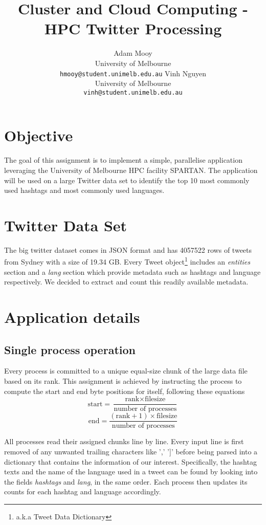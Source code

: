 \documentclass[11pt]{article}
\title{Cluster and Cloud Computing - HPC Twitter Processing}
\author{Adam Mooy\\
	    University of Melbourne\\
	    {\tt hmooy@student.unimelb.edu.au}
  \And Vinh Nguyen\\
  	University of Melbourne\\
	    {\tt vinh@student.unimelb.edu.au}}
\begin{document}
\maketitle

\section{Objective}

The goal of this assignment is to implement a simple, parallelise application leveraging the University of Melbourne HPC facility SPARTAN. The application will be used on a large Twitter data set to identify the top 10 most commonly used hashtags and most commonly used languages. 

\section{Twitter Data Set}
The big twitter dataset comes in JSON format and has 4057522 rows of tweets from Sydney with a size of 19.34 GB. Every Tweet object\footnote{a.k.a Tweet Data Dictionary} includes an \textit{entities} section and a \textit{lang} section which provide metadata such as hashtags and language respectively. We decided to extract and count this readily available metadata. 

\section{Application details}
\subsection{Single process operation}
Every process is committed to a unique equal-size chunk of the large data file based on its rank. This assignment is achieved by instructing the process to compute the start and end byte positions for itself, following these equations
\[\textrm{start} =  \frac{\textrm{rank} \times \textrm{filesize}}{\textrm{number of processes}} \] 
\[\textrm{end} =  \frac{(\textrm{rank}+1) \times \textrm{filesize}}{\textrm{number of processes}} \] 

All processes read their assigned chunks line by line. Every input line is first removed of any unwanted trailing characters like ',' ']' before being parsed into a dictionary that contains the information of our interest. Specifically, the hashtag texts and the name of the language used in a tweet can be found by looking into the fields \textit{hashtags} and \textit{lang}, in the same order. Each process then updates its counts for each hashtag and language accordingly. 
\end{document}
